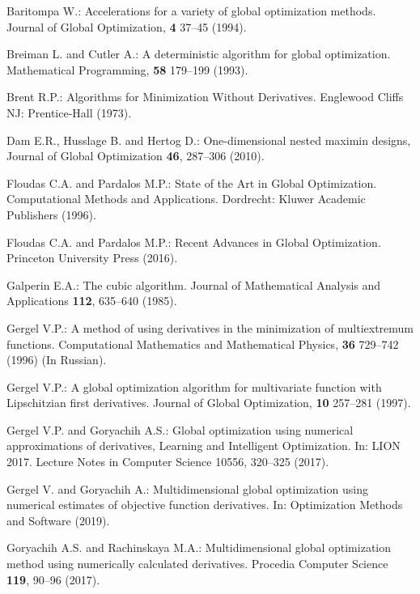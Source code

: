 \documentclass[runningheads]{llncs}
\begin{document}
%
\begin{thebibliography}{8}

Baritompa W.: Accelerations for a variety of global optimization methods. Journal of Global Optimization, \textbf{4} 37--45 (1994).

Breiman L. and Cutler A.: A deterministic algorithm for global optimization. Mathematical Programming, \textbf{58} 179--199 (1993).

Brent R.P.: Algorithms for Minimization Without Derivatives. Englewood Cliffs NJ: Prentice-Hall (1973).

Dam E.R., Husslage B. and Hertog D.: One-dimensional nested maximin designs, Journal of Global Optimization \textbf{46}, 287--306 (2010).

Floudas C.A. and Pardalos M.P.: State of the Art in Global Optimization. Computational Methods and Applications. Dordrecht: Kluwer Academic Publishers (1996).

Floudas C.A. and Pardalos M.P.: Recent Advances in Global Optimization. Princeton University Press (2016).

Galperin E.A.: The cubic algorithm. Journal of Mathematical Analysis and Applications \textbf{112}, 635--640 (1985).

Gergel V.P.: A method of using derivatives in the minimization of multiextremum functions. Computational Mathematics and Mathematical Physics, \textbf{36} 729--742 (1996) (In Russian).
	
Gergel V.P.: A global optimization algorithm for multivariate function with Lipschitzian first derivatives. Journal of Global Optimization, \textbf{10}  257--281 (1997).

Gergel V.P. and Goryachih A.S.: Global optimization using numerical approximations of derivatives, Learning and Intelligent Optimization. In: LION 2017. Lecture Notes in Computer Science 10556, 320--325 (2017).

Gergel V. and Goryachih A.: Multidimensional global optimization using numerical estimates of objective function derivatives. In: Optimization Methods and Software (2019).

Goryachih A.S. and Rachinskaya M.A.: Multidimensional global optimization method using numerically calculated derivatives. Procedia Computer Science \textbf{119}, 90--96 (2017).


\end{thebibliography}
\end{document}
